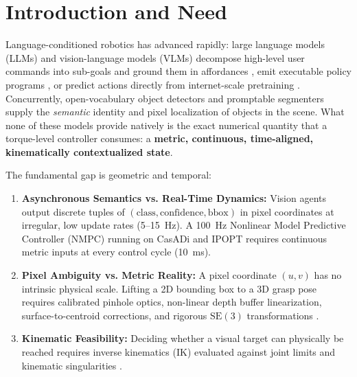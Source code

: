 \documentclass[10pt,a4paper]{article}
\begin{document}
\vspace{0.4cm}
\tableofcontents
\newpage

\section{Introduction and Need}
Language-conditioned robotics has advanced rapidly: large language models (LLMs) and vision-language models (VLMs) decompose high-level user commands into sub-goals and ground them in affordances \cite{ahn2022saycan}, emit executable policy programs \cite{liang2023code}, or predict actions directly from internet-scale pretraining \cite{brohan2023rt1}. Concurrently, open-vocabulary object detectors and promptable segmenters \cite{ren2015faster, liu2023grounding, kirillov2023segment} supply the \emph{semantic} identity and pixel localization of objects in the scene. What none of these models provide natively is the exact numerical quantity that a torque-level controller consumes: a \textbf{metric, continuous, time-aligned, kinematically contextualized state}.

The fundamental gap is geometric and temporal:
\begin{enumerate}
    \item \textbf{Asynchronous Semantics vs. Real-Time Dynamics:} Vision agents output discrete tuples of $(\mathrm{class}, \mathrm{confidence}, \mathrm{bbox})$ in pixel coordinates at irregular, low update rates (5--15~Hz). A 100~Hz Nonlinear Model Predictive Controller (NMPC) running on CasADi and IPOPT \cite{andersson2019casadi, wachter2006implementation} requires continuous metric inputs at every control cycle (10~ms).
    \item \textbf{Pixel Ambiguity vs. Metric Reality:} A pixel coordinate $(u, v)$ has no intrinsic physical scale. Lifting a 2D bounding box to a 3D grasp pose requires calibrated pinhole optics, non-linear depth buffer linearization, surface-to-centroid corrections, and rigorous $\mathrm{SE}(3)$ transformations \cite{hartley2004multiple, zhang2000flexible}.
    \item \textbf{Kinematic Feasibility:} Deciding whether a visual target can physically be reached requires inverse kinematics (IK) evaluated against joint limits and kinematic singularities \cite{craig2005introduction, siciliano2009robotics, lynch2017modern}.
\end{enumerate}
\end{document}
